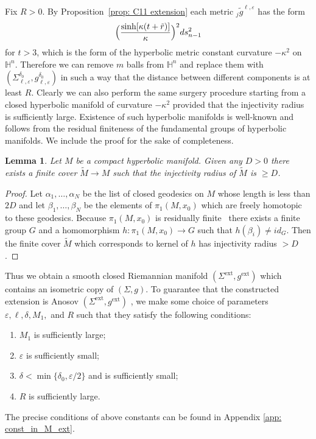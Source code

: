 \documentclass[JEP,XML,SOM,Unicode,NoFloatCountersInSection]{cedram}
\newcommand{\ext}{\mathrm{ext}}
\newtheorem{lemma}[theorem]{Lemma}
\theoremstyle{definition}
\let\eps\varepsilon
\renewcommand{\>}{{\rangle}}
\newcommand{\<}{{\langle}}
\begin{document}
Fix $R>0$. By Proposition~\ref{prop: C11 extension} each metric ${}_j\tilde g^{\ell,\eps}$ has the form
\[
\Bigl(\frac{\sinh[\kappa(t+\tilde r)]}{\kappa}\Bigr)^2ds^2_{n-1}
\]
for $t > 3$, which is the form of the hyperbolic metric constant curvature $-\kappa^2$ on $\mathbb H^n$. Therefore we can remove $m$ balls from $\mathbb H^n$ and replace them with $(\Sigma^{\delta_0}_{\ell,\eps}, g^{\delta_0}_{\ell,\eps})$ in such a way that the distance between different components is at least $R$. Clearly we can also perform the same surgery procedure starting from a closed hyperbolic manifold of curvature $-\kappa^2$ provided that the injectivity radius is sufficiently large.
Existence of such hyperbolic manifolds is well-known and follows from the residual finiteness of the fundamental groups of hyperbolic manifolds. We include the proof for the sake of completeness.
\begin{lemma}\label{lemma: large injectivity radius}
Let $M$ be a compact hyperbolic manifold. Given any $D>0$ there exists a finite cover $\tilde M\to M$ such that the injectivity radius of $\tilde M$ is $\ge D$.
\end{lemma}

\begin{proof}
Let $\alpha_1,\dots,\alpha_N$ be the list of closed geodesics on $M$ whose length is less than $2D$ and let $\beta_1,\dots,\beta_N$ be the elements of $\pi_1(M,x_0)$ which are freely homotopic to these geodesics. Because $\pi_1(M,x_0)$ is residually finite~\cite{Mal} there exists a finite group $G$ and a homomorphism $h\colon \pi_1(M,x_0)\to G$ such that $h(\beta_i)\neq id_G$. Then the finite cover $\tilde M$ which corresponds to kernel of $h$ has injectivity radius $>D$.
\end{proof}

Thus we obtain
a smooth closed Riemannian manifold $(\Sigma^{\ext}, g^{\ext})$ which contains an isometric copy of $(\Sigma,g)$. To guarantee that the constructed extension is Anosov $(\Sigma^{\ext}, g^{\ext})$ , we make some choice of parameters $\eps, \ell, \delta, M_1,$ and $R$ such that they satisfy the following conditions:
\begin{enumerate}\renewcommand{\theenumi}{C\arabic{enumi}}
\item $M_1$ is sufficiently large;
\item \label{cond: eps} $\eps$ is sufficiently small;
\item\label{cond: delta} $\delta<\min\{\delta_0, \eps/2\}$ and is sufficiently small;
\item $R$ is sufficiently large.
\end{enumerate}
The precise conditions of above constants can be found in Appendix \ref{app: const_in_M_ext}.
\end{document}
